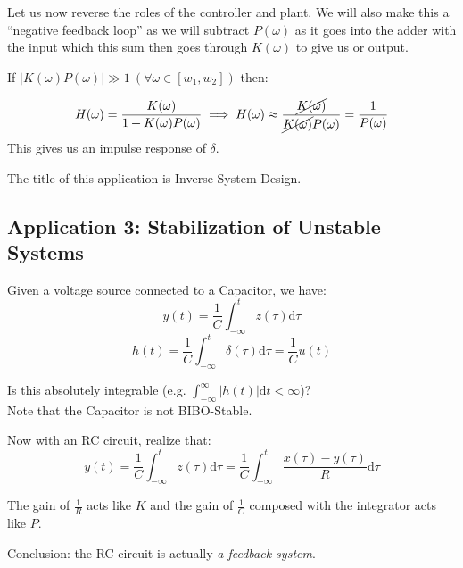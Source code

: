 Let us now reverse the roles of the controller and plant. We will also make this a ``negative feedback loop'' as we will subtract $P(\omega)$ as it goes into the adder with the input which this sum then goes through $K(\omega)$ to give us or output.

If $|K(\omega)P(\omega)|\gg1\ (\forall\omega\in[w_1, w_2])$ then:

\[
    H(\omega) = \frac{K(\omega)}{1+K(\omega)P(\omega)}
    \implies
    H(\omega) \approx \frac{\cancel{K(\omega)}}{\cancel{K(\omega)}P(\omega)}=\frac1{P(\omega)}
\]
This gives us an impulse response of $\delta$.

The title of this application is Inverse System Design.

\subsection{Application 3: Stabilization of Unstable Systems}
Given a voltage source connected to a Capacitor, we have:
\[
    y(t)=\frac1C\int_{-\infty}^t z(\tau)\mathrm d\tau
\]
\[
    h(t)=\frac1C\int_{-\infty}^t 
    \delta(\tau)\mathrm d\tau
    =\frac1C u(t)
\]

Is this absolutely integrable (e.g. $\int_{-\infty}^\infty |h(t)|\mathrm d t< \infty$)?\\
Note that the Capacitor is not BIBO-Stable.

Now with an RC circuit, realize that:
\[
    y(t)=\frac1C\int_{-\infty}^t z(\tau)\mathrm d\tau
    =\frac1C\int_{-\infty}^t \frac{x(\tau)-y(\tau)}{R}\mathrm d\tau
\]

The gain of $\frac1R$ acts like $K$ and the gain of $\frac1C$ composed with the integrator acts like $P$.

Conclusion: the RC circuit is actually \textit{a feedback system}.
